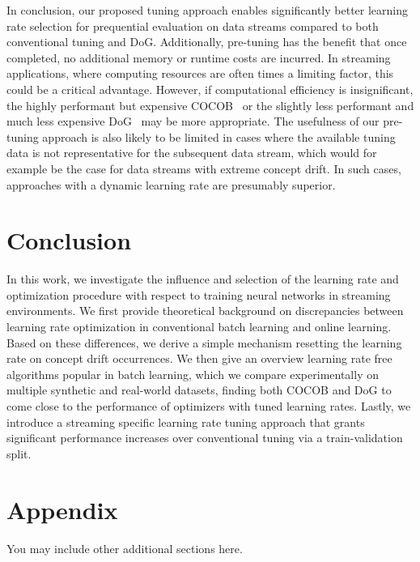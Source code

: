 \documentclass{article} %
\begin{document}
In conclusion, our proposed tuning approach enables significantly better learning rate selection for prequential evaluation on data streams compared to both conventional tuning and DoG.
Additionally, pre-tuning has the benefit that once completed, no additional memory or runtime costs are incurred.
In streaming applications, where computing resources are often times a limiting factor, this could be a critical advantage.
However, if computational efficiency is insignificant, the highly performant but expensive COCOB~\citep{orabonaTrainingDeepNetworks2017} or the slightly less performant and much less expensive DoG~\citep{ivgiDoGSGDBest2023} may be more appropriate.
The usefulness of our pre-tuning approach is also likely to be limited in cases where the available tuning data is not representative for the subsequent data stream, which would for example be the case for data streams with extreme concept drift.
In such cases, approaches with a dynamic learning rate are presumably superior.

\section{Conclusion}

In this work, we investigate the influence and selection of the learning rate and optimization procedure with respect to training neural networks in streaming environments.
We first provide theoretical background on discrepancies between learning rate optimization in conventional batch learning and online learning.
Based on these differences, we derive a simple mechanism resetting the learning rate on concept drift occurrences.
We then give an overview learning rate free algorithms popular in batch learning, which we compare experimentally on multiple synthetic and real-world datasets,
finding both COCOB and DoG to come close to the performance of optimizers with tuned learning rates.
Lastly, we introduce a streaming specific learning rate tuning approach that grants significant performance increases over conventional tuning via a train-validation split.




\appendix
\section{Appendix}
You may include other additional sections here.
\end{document}

